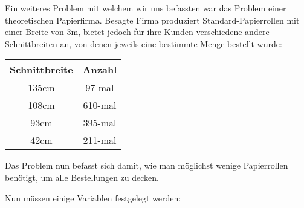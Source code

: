 Ein weiteres Problem mit welchem wir uns befassten war das Problem einer theoretischen Papierfirma. Besagte Firma produziert Standard-Papierrollen mit einer Breite von 3m, bietet jedoch für ihre Kunden verschiedene andere Schnittbreiten an, von denen jeweils eine bestimmte Menge bestellt wurde: \newline
{\centering
\begin{tabular}{|c|c|}
\hline Schnittbreite & Anzahl \\
\hline 135cm & 97-mal \\ 
\hline 108cm & 610-mal \\ 
\hline 93cm & 395-mal \\ 
\hline 42cm & 211-mal \\ 
\hline 
\end{tabular}}

\vspace{10pt}

Das Problem nun befasst sich damit, wie man möglichst wenige Papierrollen benötigt, um alle Bestellungen zu decken.

Nun müssen einige Variablen festgelegt werden:


